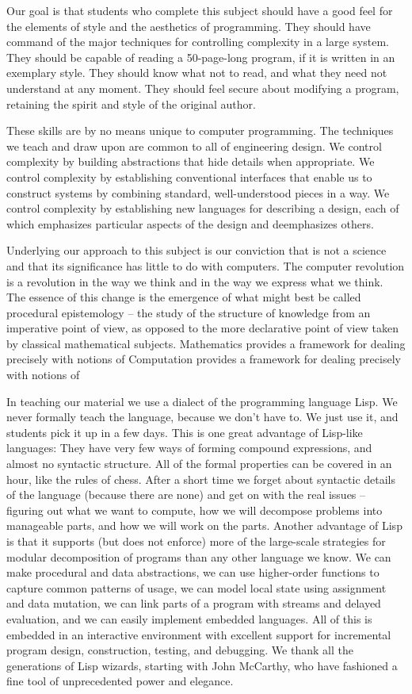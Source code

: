 Our goal is that students who complete this subject
should have a good feel for the elements of style and the aesthetics of programming.
They should have command of the major techniques for controlling complexity in a large system.
They should be capable of reading a 50-page-long program, if it is written in an exemplary style.
They should know what not to read, and what they need not understand at any moment.
They should feel secure about modifying a program, retaining the spirit and style of the original author.

These skills are by no means unique to computer programming.
The techniques we teach and draw upon are common to all of engineering design.
We control complexity by building abstractions that hide details when appropriate.
We control complexity by establishing conventional interfaces that
enable us to construct systems by combining standard, well-understood pieces in a  way.
We control complexity by establishing new languages for describing a design,
each of which emphasizes particular aspects of the design and deemphasizes others.

Underlying our approach to this subject is our conviction that
 is not a science and that its significance has little to do with computers.
The computer revolution is a revolution in the way we think and in the way we express what we think.
The essence of this change is the emergence of what might best be called procedural epistemology
-- the study of the structure of knowledge from an imperative point of view,
as opposed to the more declarative point of view taken by classical mathematical subjects.
Mathematics provides a framework for dealing precisely with notions of 
Computation provides a framework for dealing precisely with notions of 

In teaching our material we use a dialect of the programming language Lisp.
We never formally teach the language, because we don't have to.
We just use it, and students pick it up in a few days.
This is one great advantage of Lisp-like languages:
They have very few ways of forming compound expressions, and almost no syntactic structure.
All of the formal properties can be covered in an hour, like the rules of chess.
After a short time we forget about syntactic details of the language (because there are none)
and get on with the real issues -- figuring out
what we want to compute,
how we will decompose problems into manageable parts,
and how we will work on the parts.
Another advantage of Lisp is that
it supports (but does not enforce) more of the large-scale strategies for modular decomposition of programs
than any other language we know.
We can make procedural and data abstractions,
we can use higher-order functions to capture common patterns of usage,
we can model local state using assignment and data mutation,
we can link parts of a program with streams and delayed evaluation,
and we can easily implement embedded languages.
All of this is embedded in an interactive environment
with excellent support for incremental program design, construction, testing, and debugging.
We thank all the generations of Lisp wizards,
starting with John McCarthy, who have fashioned a fine tool of unprecedented power and elegance.

